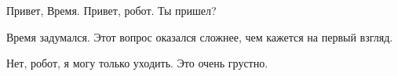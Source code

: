 \begin{dialog}
\X Привет, Время.
\R Привет, робот.
\X Ты пришел?
\end{dialog}

\begin{monolog}
Время задумался. Этот вопрос оказался сложнее, чем кажется на первый взгляд.
\end{monolog}

\begin{dialog}
\X Нет, робот, я могу только уходить.
\R Это очень грустно.
\end{dialog}